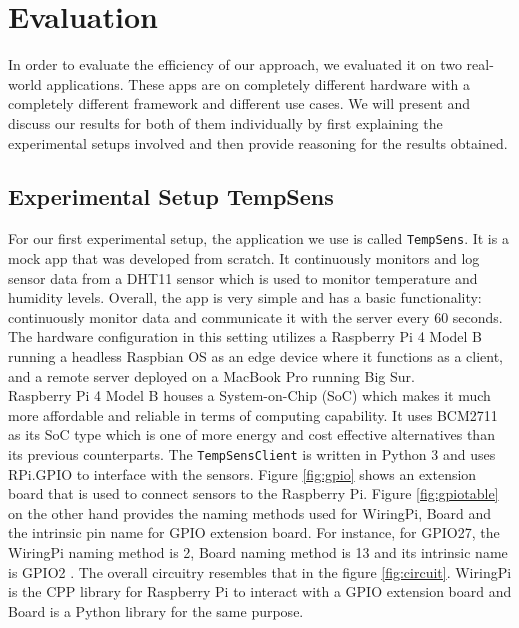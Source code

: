 \chapter{Evaluation}
In order to evaluate the efficiency of our approach, we evaluated it on two real-world applications. These apps 
are on completely different hardware with a completely different framework and different use cases. We will 
present and discuss our results for both of them individually by first explaining the experimental setups involved 
and then provide reasoning for the results obtained. \\

\section{Experimental Setup \textemdash TempSens}
For our first experimental setup, the application we use is called \texttt{TempSens}. It is a mock app that 
was developed from scratch. It continuously monitors and log sensor data from a DHT11 sensor which is used 
to monitor temperature and humidity levels. Overall, 
the app is very simple and has a basic functionality: continuously monitor data and communicate it with the server 
every 60 seconds. The hardware configuration in this setting utilizes a Raspberry Pi 4 Model B running 
a headless Raspbian OS as an edge device where it functions as a client, and a remote server deployed on a MacBook 
Pro running Big Sur. \\
Raspberry Pi 4 Model B houses a System-on-Chip (SoC) which makes it much more affordable and reliable in terms of 
computing capability. It uses BCM2711 as its SoC type which is one of more energy and cost effective alternatives 
than its previous counterparts. The \texttt{TempSensClient} is written in Python 3 and uses RPi.GPIO to interface 
with the sensors. Figure \ref{fig:gpio} shows an extension board that is used to connect sensors to the Raspberry Pi. 
Figure \ref{fig:gpiotable} on the other hand provides the naming methods used for WiringPi, Board and the 
intrinsic pin name for GPIO extension board. For instance, for GPIO27, the WiringPi naming method is 2, Board naming 
method is 13 and its intrinsic name is GPIO2 \cite{gpio}. The overall circuitry resembles that in the figure \ref{fig:circuit}.
WiringPi \cite{wiring} is the CPP library for Raspberry Pi to interact with a GPIO extension board and Board 
\cite{pypi} is a Python library 
for the same purpose. 


